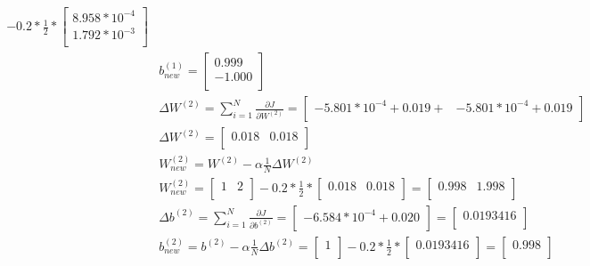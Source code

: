 \documentclass[leqno]{article}
\begin{document}
\begin{gather*}
\begin{split}
- 0.2*\frac{1}{2} *
\begin{bmatrix}
8.958*10^{-4} \\
1.792*10^{-3}\\
\end{bmatrix}\\
&b_{new}^{(1)} = 
\begin{bmatrix}
0.999 \\
-1.000\\
\end{bmatrix}\\
&\Delta W^{(2)} = \sum_{i = 1}^N \frac{\partial J}{\partial W^{(2)}} =
  \begin{bmatrix}
    -5.801*10^{-4} + 0.019 +  & -5.801*10^{-4} + 0.019\\
  \end{bmatrix}\\
&\Delta W^{(2)} =
  \begin{bmatrix}
    0.018 & 0.018\\
  \end{bmatrix}\\
&W_{new}^{(2)} = W^{(2)} - \alpha\frac{1}{N}\Delta W^{(2)}\\
&W_{new}^{(2)} = 
  \begin{bmatrix}
    1 & 2\\
  \end{bmatrix}
- 0.2*\frac{1}{2}*
  \begin{bmatrix}
    0.018 & 0.018\\
  \end{bmatrix} =
  \begin{bmatrix}
    0.998 & 1.998\\
  \end{bmatrix}\\
&\Delta b^{(2)} = \sum_{i = 1}^N \frac{\partial J}{\partial b^{(2)}} =
\begin{bmatrix}
-6.584*10^{-4} + 0.020\\
\end{bmatrix} =
\begin{bmatrix}
0.0193416\\
\end{bmatrix}\\
&b_{new}^{(2)} = b^{(2)} - \alpha\frac{1}{N}\Delta b^{(2)} = 
\begin{bmatrix}
1\\
\end{bmatrix} - 0.2*\frac{1}{2}*
\begin{bmatrix}
0.0193416\\
\end{bmatrix}
=
\begin{bmatrix}
 0.998\\
\end{bmatrix}\\
\end{split}
\end{gather*}
\end{document}
